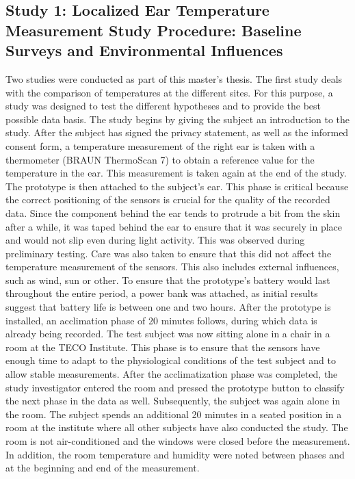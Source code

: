 \subsection{Study 1: Localized Ear Temperature Measurement Study Procedure: Baseline Surveys and Environmental Influences}
\label{ch:Design:Study:Study1}
Two studies were conducted as part of this master's thesis. 
The first study deals with the comparison of temperatures at the different sites.
For this purpose, a study was designed to test the different hypotheses and to provide the best possible data basis. 
The study begins by giving the subject an introduction to the study. 
After the subject has signed the privacy statement, as well as the informed consent form, a temperature measurement of the right ear is taken with a thermometer (BRAUN ThermoScan 7) to obtain a reference value for the temperature in the ear. 
This measurement is taken again at the end of the study.
The prototype is then attached to the subject's ear. 
This phase is critical because the correct positioning of the sensors is crucial for the quality of the recorded data.
Since the component behind the ear tends to protrude a bit from the skin after a while, it was taped behind the ear to ensure that it was securely in place and would not slip even during light activity. 
This was observed during preliminary testing. 
Care was also taken to ensure that this did not affect the temperature measurement of the sensors.
This also includes external influences, such as wind, sun or other.
To ensure that the prototype's battery would last throughout the entire period, a power bank was attached, as initial results suggest that battery life is between one and two hours.
After the prototype is installed, an acclimation phase of 20 minutes follows, during which data is already being recorded. 
The test subject was now sitting alone in a chair in a room at the TECO Institute.
This phase is to ensure that the sensors have enough time to adapt to the physiological conditions of the test subject and to allow stable measurements.
After the acclimatization phase was completed, the study investigator entered the room and pressed the prototype button to classify the next phase in the data as well.
Subsequently, the subject was again alone in the room. 
The subject spends an additional 20 minutes in a seated position in a room at the institute where all other subjects have also conducted the study. 
The room is not air-conditioned and the windows were closed before the measurement.
In addition, the room temperature and humidity were noted between phases and at the beginning and end of the measurement. 
